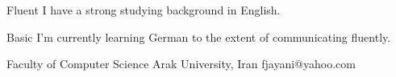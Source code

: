 \documentclass[a4paper,12pt]{memoir} %
\begin{document}

{Fluent}
{I have a strong studying background in English.}

{Basic}
{I'm currently learning German to the extent of communicating fluently.}


\Sep %




{Faculty of Computer Science}
{Arak University, Iran}
{fjayani@yahoo.com}




\Sep %
\end{document}
